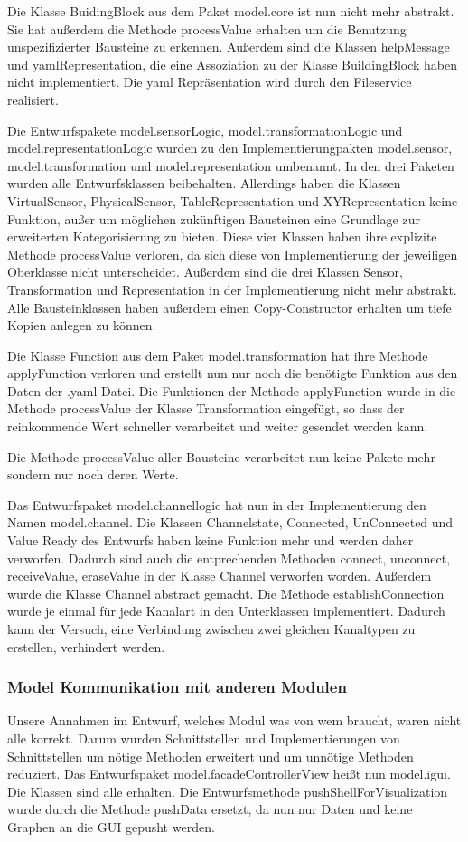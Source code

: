\documentclass[parskip=full]{scrartcl}
\begin{document}
Die Klasse BuidingBlock aus dem Paket model.core ist nun nicht mehr abstrakt. Sie hat außerdem die Methode processValue erhalten um die Benutzung unspezifizierter Bausteine zu erkennen. Außerdem sind die Klassen helpMessage und yamlRepresentation, die eine Assoziation zu der Klasse BuildingBlock haben nicht implementiert. Die yaml Repräsentation wird durch den Fileservice realisiert.

Die Entwurfspakete model.sensorLogic, model.transformationLogic und model.representationLogic wurden zu den Implementierungpakten model.sensor, model.transformation und model.representation umbenannt. In den drei Paketen wurden alle Entwurfsklassen beibehalten. Allerdings haben die Klassen VirtualSensor, PhysicalSensor, TableRepresentation und XYRepresentation keine Funktion, außer um möglichen zukünftigen Bausteinen eine Grundlage zur erweiterten Kategorisierung zu bieten. Diese vier Klassen haben ihre explizite Methode processValue verloren, da sich diese von Implementierung der jeweiligen Oberklasse nicht unterscheidet. Außerdem sind die drei Klassen Sensor, Transformation und Representation in der Implementierung nicht mehr abstrakt. Alle Bausteinklassen haben außerdem einen Copy-Constructor erhalten um tiefe Kopien anlegen zu können.

Die Klasse Function aus dem Paket model.transformation hat ihre Methode applyFunction verloren und erstellt nun nur noch die benötigte Funktion aus den Daten der .yaml Datei. Die Funktionen der Methode applyFunction wurde in die Methode processValue der Klasse Transformation eingefügt, so dass der reinkommende Wert schneller verarbeitet und weiter gesendet werden kann.

Die Methode processValue aller Bausteine verarbeitet nun keine Pakete mehr sondern nur noch deren Werte.

Das Entwurfspaket model.channellogic hat nun in der Implementierung den Namen model.channel. Die Klassen Channelstate, Connected, UnConnected und Value Ready des Entwurfs haben keine Funktion mehr und werden daher verworfen. Dadurch sind auch die entprechenden Methoden connect, unconnect, receiveValue, eraseValue in der Klasse Channel verworfen worden. Außerdem wurde die Klasse Channel abstract gemacht. Die Methode establishConnection wurde je einmal für jede Kanalart in den Unterklassen implementiert. Dadurch kann der Versuch, eine Verbindung zwischen zwei gleichen Kanaltypen zu erstellen, verhindert werden. 


\subsubsection{Model Kommunikation mit anderen Modulen}
Unsere Annahmen im Entwurf, welches Modul was von wem braucht, waren nicht alle korrekt. Darum wurden Schnittstellen und Implementierungen von Schnittstellen um nötige Methoden erweitert und um unnötige Methoden reduziert.
Das Entwurfspaket model.facadeControllerView heißt nun model.igui. Die Klassen sind alle erhalten. Die Entwurfsmethode pushShellForVisualization wurde durch die Methode pushData ersetzt, da nun nur Daten und keine Graphen an die GUI gepusht werden.
\end{document}

